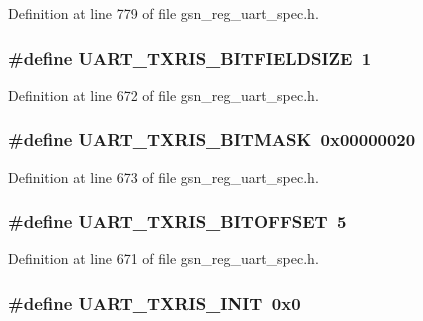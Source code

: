 Definition at line 779 of file gsn\_\-reg\_\-uart\_\-spec.h.

\hypertarget{a00575_a020e695d0e415519c95f924bc9f7d491}{
\subsubsection[{UART\_\-TXRIS\_\-BITFIELDSIZE}]{\setlength{\rightskip}{0pt plus 5cm}\#define UART\_\-TXRIS\_\-BITFIELDSIZE~1}}
\label{a00575_a020e695d0e415519c95f924bc9f7d491}


Definition at line 672 of file gsn\_\-reg\_\-uart\_\-spec.h.

\hypertarget{a00575_a640cbab7b80951d1cf3652438ac397d3}{
\subsubsection[{UART\_\-TXRIS\_\-BITMASK}]{\setlength{\rightskip}{0pt plus 5cm}\#define UART\_\-TXRIS\_\-BITMASK~0x00000020}}
\label{a00575_a640cbab7b80951d1cf3652438ac397d3}


Definition at line 673 of file gsn\_\-reg\_\-uart\_\-spec.h.

\hypertarget{a00575_abfb4a72a72e0f05d65405b04a5cf4c19}{
\subsubsection[{UART\_\-TXRIS\_\-BITOFFSET}]{\setlength{\rightskip}{0pt plus 5cm}\#define UART\_\-TXRIS\_\-BITOFFSET~5}}
\label{a00575_abfb4a72a72e0f05d65405b04a5cf4c19}


Definition at line 671 of file gsn\_\-reg\_\-uart\_\-spec.h.

\hypertarget{a00575_a9536ef0c42e5569dd53275894ebfb33d}{
\subsubsection[{UART\_\-TXRIS\_\-INIT}]{\setlength{\rightskip}{0pt plus 5cm}\#define UART\_\-TXRIS\_\-INIT~0x0}}
\label{a00575_a9536ef0c42e5569dd53275894ebfb33d}


